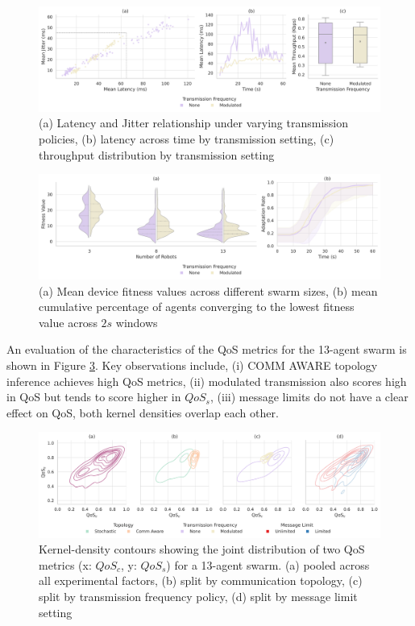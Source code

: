 \documentclass[conference]{IEEEtran}
\begin{document}
\begin{figure}[h]
    \centering
    \includegraphics[width=1\textwidth]{frequency_impact.pdf}
    \caption{(a) Latency and Jitter relationship under varying transmission policies, (b) latency across time by transmission setting, (c) throughput distribution by transmission setting}
    \label{fig:frequency}
\end{figure}

\begin{figure}[h]
    \centering
    \includegraphics[width=1\textwidth]{f_performance_impact.pdf}
    \caption{(a) Mean device fitness values across different swarm sizes, (b) mean cumulative percentage of agents converging to the lowest fitness value across $2s$ windows}
    \label{fig:f-performance}
\end{figure}

An evaluation of the characteristics of the QoS metrics for the 13-agent swarm is shown in Figure \ref{fig:qos}. Key observations include, (i) COMM AWARE topology inference achieves high QoS metrics, (ii) modulated transmission also scores high in QoS but tends to score higher in $QoS_s$, (iii) message limits do not have a clear effect on QoS, both kernel densities overlap each other.

\begin{figure}[h]
    \centering
    \includegraphics[width=1\textwidth]{qos_impact.pdf}
    \caption{Kernel-density contours showing the joint distribution of two QoS metrics (x: $QoS_c$, y: $QoS_s$) for a 13-agent swarm. (a) pooled across all experimental factors, (b) split by communication topology, (c) split by transmission frequency policy, (d) split by message limit setting}
    \label{fig:qos}
\end{figure}
\end{document}
